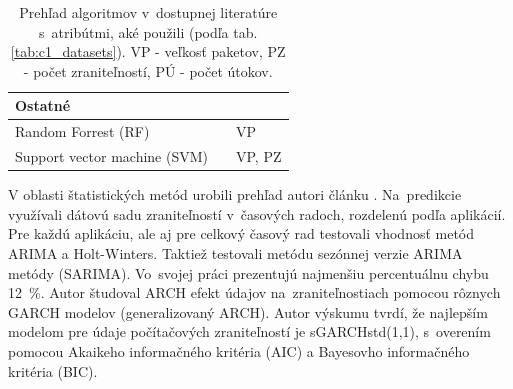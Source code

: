 \documentclass[thesismargins, thesislinespacing, openright, upjsfrontpage]{rnthesis}
\begin{document}
\begin{table}
\begin{tabular}{ | p{6cm} | p{4cm} | p{4cm} | }
         \hline \multicolumn{2}{l}{\textbf{Ostatné}} \\
         \hline Random Forrest (RF) & \cite{liu2015cloudy} & VP \\
         \hline Support vector machine (SVM) & \cite{liu2015cloudy,hasegawa2001applications,Leau2015,pokhrel2017cybersecurity} & VP, PZ \\
         
         
        
         \hline
    \end{tabular}
    \caption{Prehľad algoritmov v~dostupnej literatúre s~atribútmi, aké použili (podľa tab. \ref{tab:c1_datasets}). VP - veľkosť paketov, PZ - počet zraniteľností, PÚ - počet útokov.}
    \label{tab:c2_alg}
\end{table}

V oblasti štatistických metód urobili prehľad autori článku \cite{roumani2015time}. Na~predikcie využívali dátovú sadu zraniteľností v~časových radoch, rozdelenú podľa aplikácií. Pre každú aplikáciu, ale aj pre celkový časový rad testovali vhodnosť metód ARIMA a Holt-Winters. Taktiež testovali metódu sezónnej verzie ARIMA metódy (SARIMA). Vo~svojej práci prezentujú najmenšiu percentuálnu chybu 12~\%. Autor \cite{tang2018disclosure} študoval ARCH efekt údajov na~zraniteľnostiach pomocou rôznych GARCH modelov (generalizovaný ARCH). Autor výskumu tvrdí, že najlepším modelom pre údaje počítačových zraniteľností je sGARCHstd(1,1), s~overením pomocou Akaikeho informačného kritéria (AIC) a Bayesovho informačného kritéria (BIC).
\end{document}
